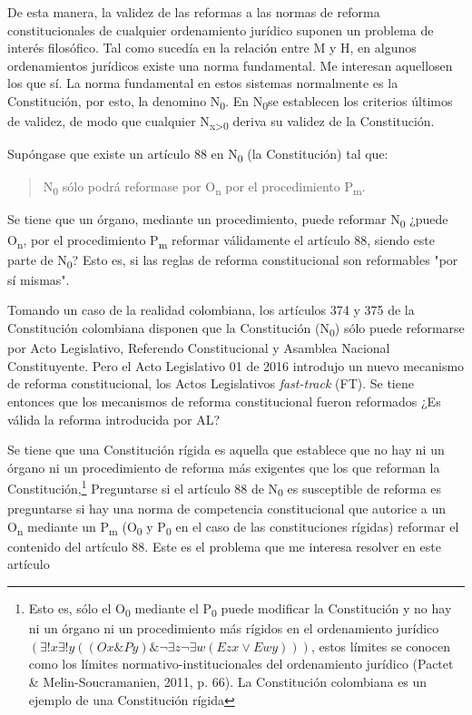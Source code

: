 \documentclass[]{book}
\begin{document}
De esta manera, la validez de las reformas a las normas de reforma
constitucionales de cualquier ordenamiento jurídico suponen un
problema de interés filosófico. Tal como sucedía en la relación entre M
y H, en algunos ordenamientos jurídicos existe una norma fundamental. Me interesan aquellosen los que sí. La norma fundamental en estos sistemas normalmente es la
Constitución, por esto, la denomino N\textsubscript{0}. En
N\textsubscript{0}se establecen los criterios últimos de validez, de
modo que cualquier N\textsubscript{x\textgreater{}0} deriva su validez
de la Constitución.

Supóngase que existe un artículo 88 en N\textsubscript{0} (la
Constitución) tal que:

\begin{quote}
	N\textsubscript{0} sólo podrá reformase por O\textsubscript{n} por el
	procedimiento P\textsubscript{m}.
\end{quote}


Se tiene que un órgano, mediante un procedimiento, puede reformar
N\textsubscript{0} ¿puede O\textsubscript{n}, por el procedimiento
P\textsubscript{m} reformar válidamente el artículo 88, siendo este
parte de N\textsubscript{0}? Esto es, si las reglas de reforma constitucional son reformables "por sí mismas".

Tomando un caso de la realidad colombiana, los artículos 374 y 375 de la
Constitución colombiana disponen que la Constitución
(N\textsubscript{0}) sólo puede reformarse por Acto Legislativo,
Referendo Constitucional y Asamblea Nacional Constituyente. Pero el Acto
Legislativo 01 de 2016 introdujo un nuevo mecanismo de reforma
constitucional, los Actos Legislativos \emph{fast-track} (FT). Se tiene
entonces que los mecanismos de reforma constitucional fueron reformados
¿Es válida la reforma introducida por AL?

Se tiene que una Constitución rígida es aquella
\protect\hypertarget{_Hlk495394696}{}{}que establece que no hay ni un
órgano ni un procedimiento de reforma más exigentes que los que reforman
la Constitución,\footnote{Esto es, sólo el O\textsubscript{0} mediante
  el P\textsubscript{0} puede modificar la Constitución y no hay ni un
  órgano ni un procedimiento más rígidos en el ordenamiento jurídico $(\exists!x \exists!y ((Ox \& Py)  \& ¬\exists z ¬\exists w (Ezx \lor Ewy)))$, estos límites se conocen como los límites
  normativo-institucionales del ordenamiento jurídico (Pactet \& Melin-Soucramanien, 2011,  p. 66). La Constitución colombiana es un ejemplo de una Constitución
  rígida} 
Preguntarse si el artículo 88 de N\textsubscript{0} es
susceptible de reforma es preguntarse si hay una norma de competencia
constitucional que autorice a un O\textsubscript{n} mediante un
P\textsubscript{m} (O\textsubscript{0} y P\textsubscript{0} en el caso
de las constituciones rígidas) reformar el contenido del artículo 88. Este es el problema que me interesa resolver en este artículo
\end{document}
